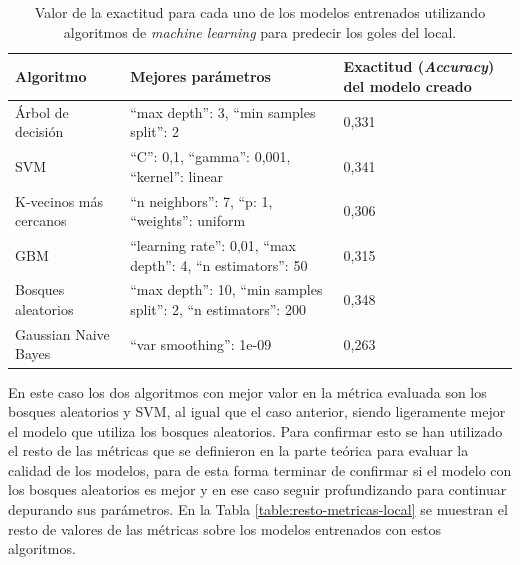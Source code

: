 \begin{table}[]
    \centering
    \begin{tabularx}{\textwidth}{|l|>{\raggedright\arraybackslash}X|l|}
        \hline
        \rowcolor[HTML]{C0C0C0}
        Algoritmo              & Mejores parámetros                                     & Exactitud (\textit{Accuracy}) del modelo creado \\ \hline
        Árbol de decisión      & ``max depth'': 3, ``min samples split'': 2                     & 0,331                                  \\ \hline
        SVM                    & ``C'': 0,1, ``gamma'': 0,001, ``kernel'': linear                   & 0,341                                  \\ \hline
        K-vecinos más cercanos & ``n neighbors'': 7, ``p: 1, ``weights'': uniform                 & 0,306                                  \\ \hline
        GBM                    & ``learning rate'': 0,01, ``max depth'': 4, ``n estimators'': 50    & 0,315                                  \\ \hline
        Bosques aleatorios     & ``max depth'': 10, ``min samples split'': 2, ``n estimators'': 200 & 0,348                                  \\ \hline
        Gaussian Naive Bayes   & ``var smoothing'': 1e-09                                  & 0,263                                  \\ \hline
    \end{tabularx}
    \caption{Valor de la exactitud para cada uno de los modelos entrenados utilizando algoritmos de \textit{machine learning} para predecir los goles del local.}
    \label{table:exactitud-local}
\end{table}

En este caso los dos algoritmos con mejor valor en la métrica evaluada son los bosques aleatorios y SVM, al igual que el caso anterior, siendo ligeramente mejor el modelo que utiliza los bosques aleatorios. Para confirmar esto se han utilizado el resto de las métricas que se definieron en la parte teórica para evaluar la calidad de los modelos, para de esta forma terminar de confirmar si el modelo con los bosques aleatorios es mejor y en ese caso seguir profundizando para continuar depurando sus parámetros. En la Tabla \ref{table:resto-metricas-local} se muestran el resto de valores de las métricas sobre los modelos entrenados con estos algoritmos.

